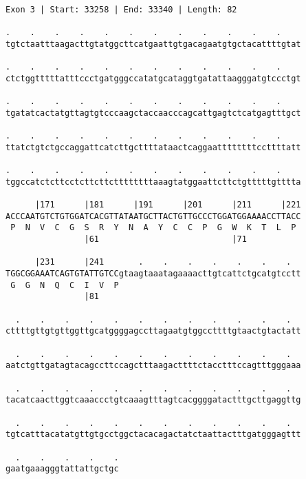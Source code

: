 \documentclass{article}
\begin{document}
\newpage
\begin{Verbatim}
Exon 3 | Start: 33258 | End: 33340 | Length: 82
 
.    .    .    .    .    .    .    .    .    .    .    .    
tgtctaatttaagacttgtatggcttcatgaattgtgacagaatgtgctacattttgtat
  
.    .    .    .    .    .    .    .    .    .    .    .    
ctctggtttttatttccctgatgggccatatgcataggtgatattaagggatgtccctgt
  
.    .    .    .    .    .    .    .    .    .    .    .    
tgatatcactatgttagtgtcccaagctaccaacccagcattgagtctcatgagtttgct
  
.    .    .    .    .    .    .    .    .    .    .    .    
ttatctgtctgccaggattcatcttgcttttataactcaggaattttttttccttttatt
  
.    .    .    .    .    .    .    .    .    .    .    .    
tggccatctcttcctcttcttcttttttttaaagtatggaattcttctgtttttgtttta
  
      |171      |181      |191      |201      |211      |221
ACCCAATGTCTGTGGATCACGTTATAATGCTTACTGTTGCCCTGGATGGAAAACCTTACC
 P  N  V  C  G  S  R  Y  N  A  Y  C  C  P  G  W  K  T  L  P 
                |61                           |71           
  
      |231      |241       .    .    .    .    .    .    .  
TGGCGGAAATCAGTGTATTGTCCgtaagtaaatagaaaacttgtcattctgcatgtcctt
 G  G  N  Q  C  I  V  P                                     
                |81                                         
  
  .    .    .    .    .    .    .    .    .    .    .    .  
cttttgttgtgttggttgcatggggagccttagaatgtggccttttgtaactgtactatt
  
  .    .    .    .    .    .    .    .    .    .    .    .  
aatctgttgatagtacagccttccagctttaagacttttctacctttccagtttgggaaa
  
  .    .    .    .    .    .    .    .    .    .    .    .  
tacatcaacttggtcaaaccctgtcaaagtttagtcacggggatactttgcttgaggttg
  
  .    .    .    .    .    .    .    .    .    .    .    .  
tgtcatttacatatgttgtgcctggctacacagactatctaattactttgatgggagttt
  
  .    .    .    .    .
gaatgaaagggtattattgctgc
\end{Verbatim}
\newpage
\end{document}
